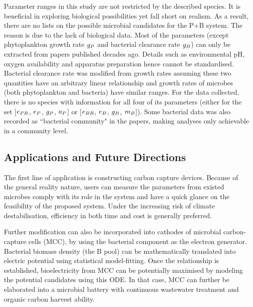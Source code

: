 \documentclass[../thesis.tex]{subfiles} %
\begin{document}
Parameter ranges in this study are not restricted by the described species.  It is beneficial in exploring biological possibilities yet fall short on realism.  As a result, there are no lists on the possible microbial candidates for the P+B system.  The reason is due to the lack of biological data.  Most of the parameters (except phytoplankton growth rate $g_P$ and bacterial clearance rate $g_B$) can only be extracted from papers published decades ago.  Details such as environmental pH, oxygen availability and apparatus preparation hence cannot be standardised.  Bacterial clearance rate was modified from growth rates assuming these two quantities have an arbitrary linear relationship and growth rates of microbes (both phytoplankton and bacteria) have similar ranges.  For the data collected, there is no species with information for all four of its parameters (either for the set [$e_{PR}$, $e_P$, $g_P$, $a_P$] or [$e_{BR}$, $e_B$, $g_B$, $m_B$]).  Some bacterial data was also recorded as ``bacterial community" in the papers,\autocite{cochran1988estimation} making analyses only achievable in a community level.

\subsection{Applications and Future Directions}
The first line of application is constructing carbon capture devices.  Because of the general reality nature, users can measure the parameters from existed microbes comply with its role in the system and have a quick glance on the feasibility of the proposed system.  Under the increasing risk of climate destabilisation,\autocite{notz2016observed,schuur2015climate} efficiency in both time and cost is generally preferred.

Further modification can also be incorporated into cathodes of microbial carbon-capture cells (MCC), \autocite{varanasi2020improvement,mohamed2020bioelectricity,neethu2018enhancement,pandit2012microbial} by using the bacterial component as the electron generator.  Bacterial biomass density (the B pool) can be mathematically translated into electric potential using statistical model-fitting.  Once the relationship is established, bioelectricity from MCC can be potentially maximised by modeling the potential candidates using this ODE.  In that case, MCC can further be elaborated into a microbial battery with continuous wastewater treatment\autocite{mohamed2020bioelectricity} and organic carbon harvest ability.
\end{document}
